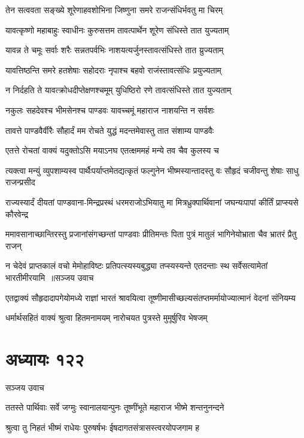 \twolineshloka
{तेन सत्ववता सङ्ख्ये शूरेणाहवशोभिना}
{जिष्णुना समरे राजन्संधिर्भवतु मा चिरम्}


\twolineshloka
{यावत्कृष्णो महाबाहुः स्वाधीनः कुरुसत्तम}
{तावत्पार्थेन शूरेण संधिस्ते तात युज्यताम्}


\twolineshloka
{यावन्न ते चमूः सर्वाः शरैः सन्नतपर्वभिः}
{नाशयत्यर्जुनस्तावत्संधिस्ते तात य्रुज्यताम्}


\twolineshloka
{यावत्तिष्ठन्ति समरे हतशेषाः सहोदराः}
{नृपाश्च बहवो राजंस्तावत्संधिः प्रयुज्यताम्}


\twolineshloka
{न निर्दहति ते यावत्क्रोधदीप्तेक्षणश्चमूम्}
{युधिष्ठिरो रणे तावत्संधिस्ते तात युज्यताम्}


\twolineshloka
{नकुलः सहदेवश्च भीमसेनश्च पाण्डवः}
{यावच्चमूं महाराज नाशयन्ति न सर्वशः}


\twolineshloka
{तावत्ते पाण्डवैर्वीरैः सौहार्दं मम रोचते}
{युद्धं मदन्तमेवास्तु तात संशाम्य पाण्डवैः}


\twolineshloka
{एतत्ते रोचतां वाक्यं यदुक्तोऽसि मयाऽनघ}
{एतत्क्षममहं मन्ये तव चैव कुलस्य च}


\twolineshloka
{त्यक्त्वा मन्युं व्युपशाम्यस्व पार्थैःपर्याप्तमेतद्यत्कृतं फल्गुनेन}
{भीष्मस्यान्तादस्तु वः सौहृदं चजीवन्तु शेषाः साधु राजन्प्रसीद}


\twolineshloka
{राज्यस्यार्दं दीयतां पाण्डवाना-मिन्द्रप्रस्थं धरमराजोऽभियातु}
{मा मित्रध्रुक्पार्थिवानां जघन्यःपापां कीर्तिं प्राप्स्यसे कौरवेन्द्र}


\twolineshloka
{ममावसानाच्छान्तिरस्तु प्रजानांसंगच्छन्तां पाण्डवाः प्रीतिमन्तः}
{पिता पुत्रं मातुलं भागिनेयोभ्राता चैव भ्रातरं प्रैतु राजन्}


\threelineshloka
{न चेदेवं प्राप्तकालं वचो मेमोहाविष्टः प्रतिपत्स्यस्यबुद्ध्या}
{तप्स्यस्यन्ते एतदन्ताः स्थ सर्वेसत्यामेतां भारतीमीरयामि ॥सञ्जय उवाच}
{}


\twolineshloka
{एतद्वाक्यं सौहृदादापगेयोमध्ये राज्ञां भारतं श्रावयित्वा}
{तूष्णीमासीच्छल्यसंतप्तमर्मायोज्यात्मानं वेदनां संनियम्य}


\twolineshloka
{धर्मार्थसहितं वाक्यं श्रुत्वा हितमनामयम्}
{नारोचयत पुत्रस्ते मुमूर्षुरिव भेषजम्}


\chapter{अध्यायः १२२}
\twolineshloka
{सञ्जय उवाच}
{}


\twolineshloka
{ततस्ते पार्थिवाः सर्वे जग्मुः स्वानालयान्पुनः}
{तूष्णींभूते महाराज भीष्मे शन्तनुनन्दने}


\twolineshloka
{श्रुत्वा तु निहतं भीष्मं राधेयः पुरुषर्षभः}
{ईषदागतसंत्रासस्त्वरयोपजगाम ह}


